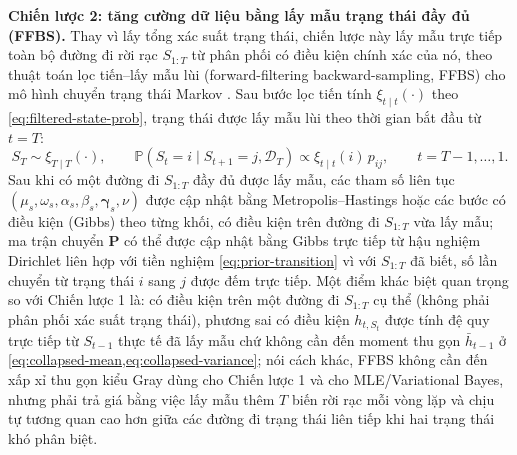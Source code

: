 \documentclass[12pt,a4paper]{article}
\numberwithin{equation}{section}
\newcommand{\bm}[1]{\symbf{#1}}
\newcommand{\Data}{\mathcal{D}}
\newcommand{\Pmat}{\bm{P}}
\newcommand{\Prob}{\mathbb{P}}
\begin{document}
\textbf{Chiến lược 2: tăng cường dữ liệu bằng lấy mẫu trạng thái đầy đủ (FFBS).} Thay vì lấy tổng xác suất trạng thái, chiến lược này lấy mẫu trực tiếp toàn bộ đường đi rời rạc $S_{1:T}$ từ phân phối có điều kiện chính xác của nó, theo thuật toán lọc tiến--lấy mẫu lùi (forward-filtering backward-sampling, FFBS) cho mô hình chuyển trạng thái Markov \cite{chib1996,fruhwirth2006}. Sau bước lọc tiến tính $\xi_{t\mid t}(\cdot)$ theo \cref{eq:filtered-state-prob}, trạng thái được lấy mẫu lùi theo thời gian bắt đầu từ $t=T$:
\begin{equation}
  S_T\sim\xi_{T\mid T}(\cdot),
  \qquad
  \Prob(S_t=i\mid S_{t+1}=j,\Data_T)
  \propto
  \xi_{t\mid t}(i)\,p_{ij},
  \qquad t=T-1,\ldots,1.
  \label{eq:ffbs-backward}
\end{equation}
Sau khi có một đường đi $S_{1:T}$ đầy đủ được lấy mẫu, các tham số liên tục $(\mu_s,\omega_s,\alpha_s,\beta_s,\bm\gamma_s,\nu)$ được cập nhật bằng Metropolis--Hastings hoặc các bước có điều kiện (Gibbs) theo từng khối, có điều kiện trên đường đi $S_{1:T}$ vừa lấy mẫu; ma trận chuyển $\Pmat$ có thể được cập nhật bằng Gibbs trực tiếp từ hậu nghiệm Dirichlet liên hợp với tiền nghiệm \cref{eq:prior-transition} vì với $S_{1:T}$ đã biết, số lần chuyển từ trạng thái $i$ sang $j$ được đếm trực tiếp. Một điểm khác biệt quan trọng so với Chiến lược 1 là: có điều kiện trên một đường đi $S_{1:T}$ cụ thể (không phải phân phối xác suất trạng thái), phương sai có điều kiện $h_{t,S_t}$ được tính đệ quy trực tiếp từ $S_{t-1}$ thực tế đã lấy mẫu chứ không cần đến moment thu gọn $\bar h_{t-1}$ ở \cref{eq:collapsed-mean,eq:collapsed-variance}; nói cách khác, FFBS không cần đến xấp xỉ thu gọn kiểu Gray dùng cho Chiến lược 1 và cho MLE/Variational Bayes, nhưng phải trả giá bằng việc lấy mẫu thêm $T$ biến rời rạc mỗi vòng lặp và chịu tự tương quan cao hơn giữa các đường đi trạng thái liên tiếp khi hai trạng thái khó phân biệt.
\end{document}
